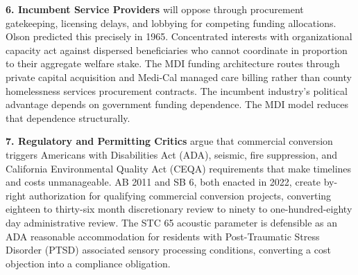 \documentclass[12pt, letterpaper]{article}
\begin{document}
\textbf{6. Incumbent Service Providers} will oppose through procurement gatekeeping, licensing delays, and lobbying for competing funding allocations. Olson predicted this precisely in 1965. Concentrated interests with organizational capacity act against dispersed beneficiaries who cannot coordinate in proportion to their aggregate welfare stake. The MDI funding architecture routes through private capital acquisition and Medi-Cal managed care billing rather than county homelessness services procurement contracts. The incumbent industry's political advantage depends on government funding dependence. The MDI model reduces that dependence structurally.

\textbf{7. Regulatory and Permitting Critics} argue that commercial conversion triggers Americans with Disabilities Act (ADA), seismic, fire suppression, and California Environmental Quality Act (CEQA) requirements that make timelines and costs unmanageable. AB 2011 and SB 6, both enacted in 2022, create by-right authorization for qualifying commercial conversion projects, converting eighteen to thirty-six month discretionary review to ninety to one-hundred-eighty day administrative review. The STC 65 acoustic parameter is defensible as an ADA reasonable accommodation for residents with Post-Traumatic Stress Disorder (PTSD) associated sensory processing conditions, converting a cost objection into a compliance obligation.
\end{document}
